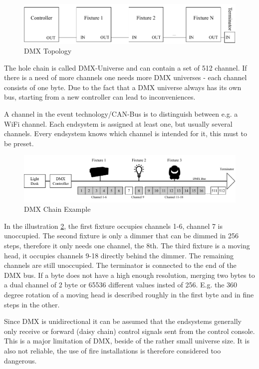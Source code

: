 \begin{figure}[h]
	\centering
	\includegraphics[scale=0.6]{figures/DMX_blockdiagram.pdf}
	\caption{DMX Topology}
	\label{fig:dmx_diagram}
\end{figure}

The hole chain is called DMX-Universe and can contain a set of 512 channel.
If there is a need of more channels one needs more DMX universes - each channel consists of one byte.
Due to the fact that a DMX universe always has its own bus, starting from a new controller can lead to inconveniences.

A channel in the event technology/CAN-Bus is to distinguish between e.g. a WiFi channel.
Each endsystem is assigned at least one, but usually several channels.
Every endsystem knows which channel is intended for it, this must to be preset.

\begin{figure}[h]
	\centering
	\includegraphics[scale=0.6]{figures/DMX_Chain.pdf}
	\caption{DMX Chain Example}
	\label{fig:dmx_chain}
\end{figure}

In the illustration \cref{fig:dmx_chain}, the first fixture occupies channels 1-6, channel 7 is unoccupied.
The second fixture is only a dimmer that can be dimmed in 256 steps, therefore it only needs one channel, the 8th.
The third fixture is a moving head, it occupies channels 9-18 directly behind the dimmer.
The remaining channels are still unoccupied.
The terminator is connected to the end of the DMX bus.
If a byte does not have a high enough resolution, merging two bytes to a dual channel of 2 byte or 65536 different values insted of 256.
E.g. the 360 degree rotation of a moving head is described roughly in the first byte and in fine steps in the other.

Since \ac{DMX} is unidirectional it can be assumed that the endsystems generally only receive or forward (daisy chain) control signals sent from the control console.
This is a major limitation of DMX, beside of the rather small universe size.
It is also not reliable, the use of fire installations is therefore considered too dangerous.

